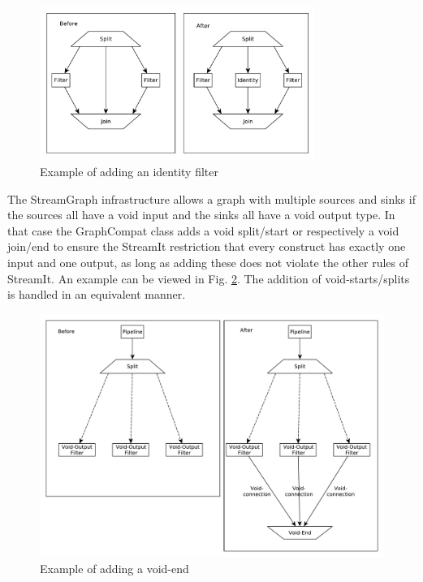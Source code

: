 \documentclass[journal]{IEEEtran}
\begin{document}
\begin{figure}[h]
	\centering
	\includegraphics[width=0.8\textwidth]{SplitJoinIdentity}
	\caption{Example of adding an identity filter}
	\label{fig_split_join_identity}
\end{figure}
\noindent The StreamGraph infrastructure allows a graph with multiple sources
and sinks if the sources all have a void input and the sinks all have a void
output type. In that case the GraphCompat class adds a void split/start or
respectively a void join/end to ensure the StreamIt restriction that every
construct has exactly one input and one output, as long as adding these does not
violate the other rules of StreamIt. An example can be viewed in Fig.
\ref{fig_void_end}. The addition of void-starts/splits is handled in an
equivalent manner.\\
\begin{figure}[h]
	\centering
	\includegraphics[width=\textwidth]{VoidEnd}
	\caption{Example of adding a void-end}
	\label{fig_void_end}
\end{figure}
\end{document}
